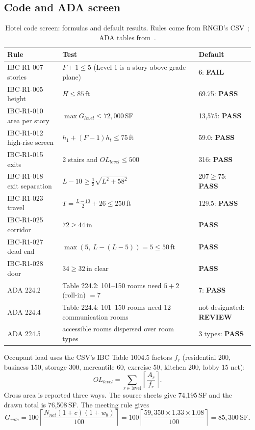 \documentclass[10pt,a4paper]{article}
\newcommand{\PASS}{\textcolor{okc}{\textbf{PASS}}}
\newcommand{\FAIL}{\textcolor{failc}{\textbf{FAIL}}}
\newcommand{\REVIEW}{\textcolor{warnc}{\textbf{REVIEW}}}
\theoremstyle{definition}
\begin{document}
\subsection{Code and ADA screen}
\begin{table}[H]
\centering\small
\caption{Hotel code screen: formulas and default results. Rules come from RNGD's CSV~\citep{rngd2026ibc}; ADA tables
from~\citep{doj2010ada}.}
\label{tab:hotelcode}
\begin{tabularx}{\linewidth}{@{}l X l@{}}
\toprule
\textbf{Rule} & \textbf{Test} & \textbf{Default} \\ \midrule
IBC-R1-007 stories & $F+1\le5$ (Level 1 is a story above grade plane) & 6: \FAIL \\
IBC-R1-005 height & $H\le85$\,ft & 69.75: \PASS \\
IBC-R1-010 area per story & $\max G_{level}\le72{,}000$\,SF & 13,575: \PASS \\
IBC-R1-012 high-rise screen & $h_1+(F-1)h_t\le75$\,ft & 59.0: \PASS \\
IBC-R1-015 exits & 2 stairs and $OL_{level}\le500$ & 316: \PASS \\
IBC-R1-018 exit separation & $L-10\ge\frac13\sqrt{L^2+58^2}$ & $207\ge75$: \PASS \\
IBC-R1-023 travel & $T=\frac{L-10}{2}+26\le250$\,ft & 129.5: \PASS \\
IBC-R1-025 corridor & $72\ge44$\,in & \PASS \\
IBC-R1-027 dead end & $\max(5,\ L-(L-5))=5\le50$\,ft & \PASS \\
IBC-R1-028 door & $34\ge32$\,in clear & \PASS \\
ADA 224.2 & Table 224.2: 101--150 rooms need $5+2$ (roll-in) $=7$ & 7: \PASS \\
ADA 224.4 & Table 224.4: 101--150 rooms need 12 communication rooms & not designated: \REVIEW \\
ADA 224.5 & accessible rooms dispersed over room types & 3 types: \PASS \\
\bottomrule
\end{tabularx}
\end{table}

Occupant load uses the CSV's IBC Table 1004.5 factors $f_r$ (residential 200, business 150, storage 300, mercantile 60,
exercise 50, kitchen 200, lobby 15 net):
\begin{equation}
OL_{level}=\sum_{r\in\text{level}}\left\lceil\frac{A_r}{f_r}\right\rceil .
\end{equation}
Gross area is reported three ways. The source sheets give 74,195\,SF and the drawn total is 76,508\,SF. The meeting rule
gives
\begin{equation}
G_{rule}=100\left\lceil\frac{N_{net}(1+c)(1+w_b)}{100}\right\rceil=100\left\lceil\frac{59{,}350\times1.33\times1.08}{100}\right\rceil=85{,}300\ \text{SF}.
\end{equation}
\end{document}
